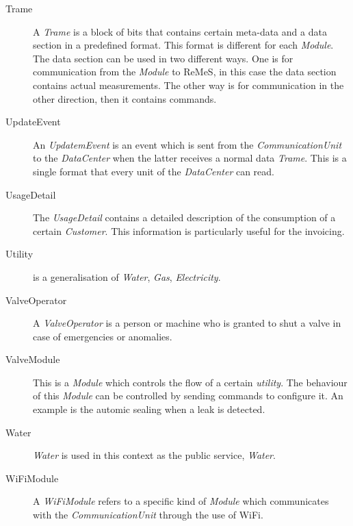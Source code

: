 \begin{description}
\item[Trame] A \emph{Trame} is a block of bits that contains certain meta-data
and a data section in a predefined format. This format is different for each
\emph{Module}. The data section can be used in two different ways. One is for
communication from the \emph{Module} to ReMeS, in this case the data section
contains actual measurements. The other way is for communication in the other
direction, then it contains commands.

\item[UpdateEvent] An \emph{UpdatemEvent} is an event which is sent from the
\emph{CommunicationUnit} to the \emph{DataCenter} when the latter receives a
normal data \emph{Trame}. This is a single format that every unit of the
\emph{DataCenter} can read.

\item[UsageDetail] The \emph{UsageDetail} contains a detailed description of the
consumption of a certain \emph{Customer}. This information is particularly
useful for the invoicing.

\item[Utility] is a generalisation of \emph{Water}, \emph{Gas},
\emph{Electricity}.

\item[ValveOperator] A \emph{ValveOperator} is a person or machine who is
granted to shut a valve in case of emergencies or anomalies.

\item[ValveModule] This is a \emph{Module} which controls the flow of a certain
\emph{utility}. The behaviour of this \emph{Module} can be controlled by sending
commands to configure it. An example is the automic sealing when a leak is
detected.

\item[Water] \emph{Water} is used in this context as the public service,
\emph{Water}.

\item[WiFiModule] A \emph{WiFiModule} refers to a specific kind of \emph{Module}
which communicates with the \emph{CommunicationUnit} through the use of WiFi.

\end{description}
